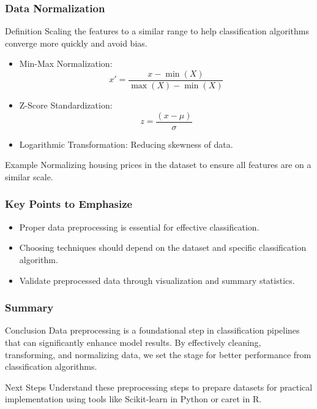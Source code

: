 \documentclass{beamer}
\begin{document}
\begin{frame}
    \frametitle{Data Normalization}
    \begin{block}{Definition}
        Scaling the features to a similar range to help classification algorithms converge more quickly and avoid bias.
    \end{block}
    
    \begin{itemize}
        \item Min-Max Normalization:
            \[
            x' = \frac{x - \min(X)}{\max(X) - \min(X)}
            \]
        \item Z-Score Standardization:
            \[
            z = \frac{(x - \mu)}{\sigma}
            \]
        \item Logarithmic Transformation: Reducing skewness of data.
    \end{itemize}
    
    \begin{block}{Example}
        Normalizing housing prices in the dataset to ensure all features are on a similar scale.
    \end{block}
\end{frame}

\begin{frame}
    \frametitle{Key Points to Emphasize}
    \begin{itemize}
        \item Proper data preprocessing is essential for effective classification.
        \item Choosing techniques should depend on the dataset and specific classification algorithm.
        \item Validate preprocessed data through visualization and summary statistics.
    \end{itemize}
\end{frame}

\begin{frame}
    \frametitle{Summary}
    \begin{block}{Conclusion}
        Data preprocessing is a foundational step in classification pipelines that can significantly enhance model results.
        By effectively cleaning, transforming, and normalizing data, we set the stage for better performance from classification algorithms.
    \end{block}
    
    \begin{block}{Next Steps}
        Understand these preprocessing steps to prepare datasets for practical implementation using tools like Scikit-learn in Python or caret in R.
    \end{block}
\end{frame}
\end{document}
